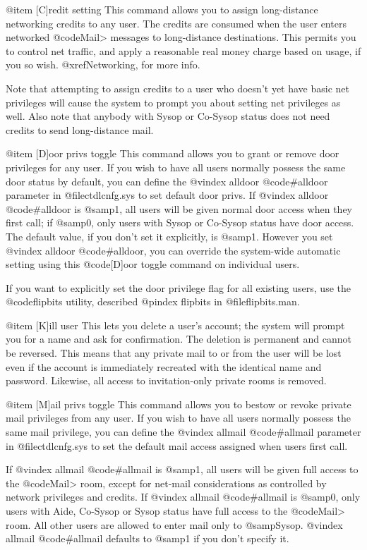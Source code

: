 @item [C]redit setting
This command allows you to assign long-distance
networking credits to any user.  The credits are consumed
when the user enters networked @code{Mail>} messages to long-distance
destinations.  This permits you to control net
traffic, and apply a reasonable real money charge based on usage, if
you so wish.  @xref{Networking}, for more info.

Note that attempting to assign credits to a user who
doesn't yet have basic net privileges will cause the system
to prompt you about setting net privileges as well.  Also
note that anybody with Sysop or Co-Sysop status does not need credits to
send long-distance mail.

@item [D]oor privs toggle
This command allows you to grant or remove door
privileges for any user.  If you wish to have all
users normally possess the same door status by default, you can
define the
@vindex alldoor
@code{#alldoor} parameter in @file{ctdlcnfg.sys} to set default
door privs.  If
@vindex alldoor
@code{#alldoor} is @samp{1}, all users will be given
normal door access when they first call; if @samp{0},
only users with Sysop or Co-Sysop status have door access.  The default
value, if you don't set it explicitly, is @samp{1}.
However you set
@vindex alldoor
@code{#alldoor}, you can override the
system-wide automatic setting using this @code{[D]oor} toggle command
on individual users.

If you want to explicitly set the door privilege flag
for all existing users, use the @code{flipbits} utility, described
@pindex flipbits
in @file{flipbits.man}.

@item [K]ill user
This lets you delete a user's account; the system will prompt you for a
name and ask for confirmation.  The deletion is permanent and cannot be
reversed.  This means that
any private mail to or from the user will be lost even if the account is
immediately recreated with the identical name and password.  Likewise,
all access to invitation-only private rooms is removed.

@item [M]ail privs toggle
This command allows you to bestow or revoke private
mail privileges from any user.  If you wish to have all
users normally possess the same mail privilege, you can
define the
@vindex allmail
@code{#allmail} parameter in @file{ctdlcnfg.sys} to set the
default mail access assigned when users first call.

If
@vindex allmail
@code{#allmail} is @samp{1}, all users will be given
full access to the @code{Mail>} room, except for net-mail
considerations as controlled by network privileges and credits.
If
@vindex allmail
@code{#allmail} is @samp{0}, only users with Aide, Co-Sysop or Sysop
status have full access to the @code{Mail>} room.  All other
users are allowed to enter mail only to @samp{Sysop}.
@vindex allmail
@code{#allmail} defaults to @samp{1} if you don't specify it.

